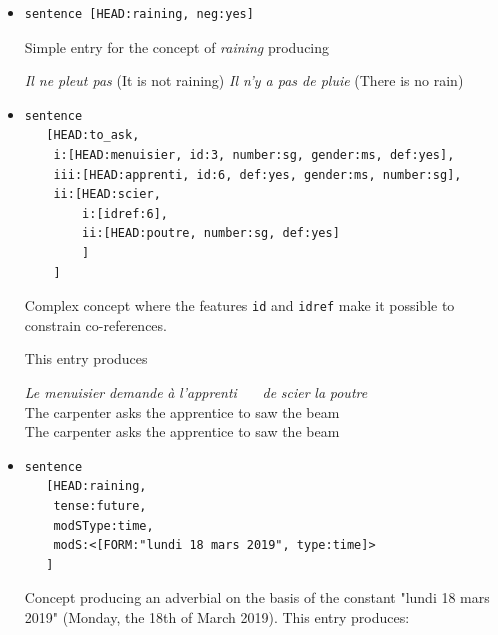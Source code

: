 \documentclass[11pt]{article}
\begin{document}
\begin{itemize}
	\item
	      \begin{verbatim}
sentence [HEAD:raining, neg:yes]
\end{verbatim}

	      Simple entry for the concept of \textit{raining} producing
	      \begin{exe}
		      \ex \begin{xlist}
			      \ex \textit{Il ne pleut pas} (It is not raining)
			      \ex \textit{Il n'y a pas de pluie} (There is no rain)
		      \end{xlist}
	      \end{exe}


	\item
	      \begin{verbatim}
sentence 
   [HEAD:to_ask,
    i:[HEAD:menuisier, id:3, number:sg, gender:ms, def:yes],
    iii:[HEAD:apprenti, id:6, def:yes, gender:ms, number:sg],
    ii:[HEAD:scier,
        i:[idref:6],
        ii:[HEAD:poutre, number:sg, def:yes]
        ]
    ]
\end{verbatim}

	      Complex concept where the features \texttt{id} and \texttt{idref}
	      make it possible to constrain co-references.

	      This entry produces
	      \begin{exe}
		      \ex
		      \begin{tabbing}
			      \textit{Le menuisier} \= \textit{demande} \= \textit{à} \textit{l'apprenti}~~~ \= \textit{de} \textit{scier} \= \textit{la} \textit{poutre}\\
			      The carpenter \> asks \> the apprentice \> to saw \> the beam\\
			      The carpenter asks the apprentice to saw the
			      beam
		      \end{tabbing}
	      \end{exe}

	\item
	      \begin{verbatim}
sentence 
   [HEAD:raining, 
    tense:future, 
    modSType:time, 
    modS:<[FORM:"lundi 18 mars 2019", type:time]>
   ]
\end{verbatim}

	      Concept producing an adverbial on the basis of the
	      constant "lundi 18 mars 2019" (Monday, the 18th of March 2019). This entry produces:


\end{itemize}
\end{document}
